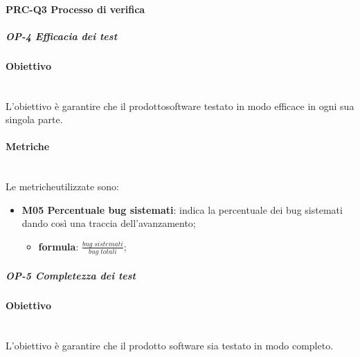 	\paragraph{PRC-Q3 Processo di verifica}
		\subparagraph{OP-4 Efficacia dei test}
		\paragraph*{Obiettivo}\mbox{}\\ [1mm]
		L'obiettivo è garantire che il prodotto\glosp software testato in modo efficace in ogni sua singola parte.
		\paragraph*{Metriche}\mbox{}\\ [1mm]
		Le metriche\glosp utilizzate sono:
		\begin{itemize}
			\item \textbf{M05 Percentuale bug sistemati}: indica la percentuale dei bug sistemati dando così una traccia dell'avanzamento;
			\begin{itemize}
				\item[] \textbf{formula}: $\frac{bug \; sistemati}{bug \; totali}$;
			\end{itemize}
		\end{itemize}
	
		\subparagraph{OP-5 Completezza dei test}
		\paragraph*{Obiettivo}\mbox{}\\ [1mm]
		L'obiettivo è garantire che il prodotto software sia testato in modo completo.
